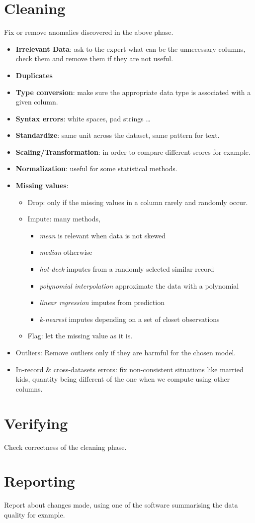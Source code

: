 \section{Cleaning}
Fix or remove anomalies discovered in the above phase.
\begin{itemize}
    \item \textbf{Irrelevant Data}: ask to the expert what can be the unnecessary columns,
        check them and remove them if they are not useful.
    \item \textbf{Duplicates}
    \item \textbf{Type conversion}: make sure the appropriate data type is associated with
        a given column.
    \item \textbf{Syntax errors}: white spaces, pad strings \dots
    \item \textbf{Standardize}: same unit across the dataset, same pattern for text.
    \item \textbf{Scaling/Transformation}: in order to compare different scores for
        example.
    \item \textbf{Normalization}: useful for some statistical methods.
    \item \textbf{Missing values}:
        \begin{itemize}
            \item Drop: only if the missing values in a column rarely and randomly occur.
            \item Impute: many methods,
                \begin{itemize}
                    \item \textit{mean} is relevant when data is not skewed
                    \item \textit{median} otherwise
                    \item \textit{hot-deck} imputes from a randomly selected similar record
                    \item \textit{polynomial interpolation} approximate the data with a polynomial
                    \item \textit{linear regression} imputes from prediction
                    \item \textit{k-nearest} imputes depending on a set of closet observations
                \end{itemize}
            \item Flag: let the missing value as it is.
        \end{itemize}
    \item Outliers: Remove outliers only if they are harmful for the chosen model.
    \item In-record \& cross-datasets errors: fix non-consistent situations like married
        kids, quantity being different of the one when we compute using other columns.
\end{itemize}

\section{Verifying}
Check correctness of the cleaning phase.

\section{Reporting}
Report about changes made, using one of the software summarising the data quality for
example.
